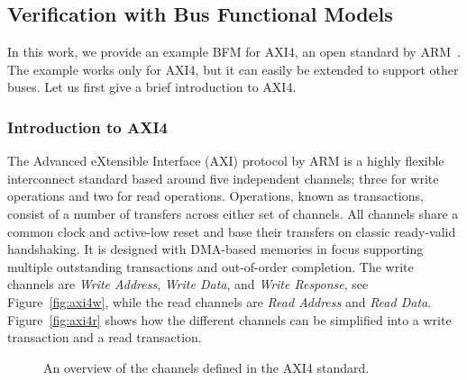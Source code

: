 \documentclass[conference]{IEEEtran}
\begin{document}
\subsection{Verification with Bus Functional Models}
In this work, we provide an example BFM for AXI4, an open standard by ARM~\cite{axi4standard}. The example works only for AXI4, but it can easily be extended to support other buses. Let us first give a brief introduction to AXI4.

\subsubsection{Introduction to AXI4}
The Advanced eXtensible Interface (AXI) protocol by ARM is a highly flexible interconnect standard based around five independent channels; three for write operations and two for read operations. Operations, known as transactions, consist of a number of transfers across either set of channels. All channels share a common clock and active-low reset and base their transfers on classic ready-valid handshaking. It is designed with DMA-based memories in focus supporting multiple outstanding transactions and out-of-order completion. The write channels are \textit{Write Address}, \textit{Write Data}, and \textit{Write Response}, see Figure~\ref{fig:axi4w}, while the read channels are \textit{Read Address} and \textit{Read Data}.
Figure~\ref{fig:axi4r} shows how the different channels can be simplified into a write transaction and a read transaction.

\begin{figure}[t]
  \centering
  \hfill
  \label{fig:axi4}
  \caption{An overview of the channels defined in the AXI4 standard.}
\end{figure}
\end{document}
